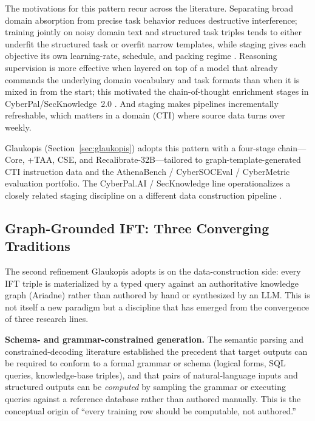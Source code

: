 \documentclass[conference]{IEEEtran}
\begin{document}
The motivations for this pattern recur across the literature. Separating broad domain absorption from precise task behavior reduces destructive interference; training jointly on noisy domain text and structured task triples tends to either underfit the structured task or overfit narrow templates, while staging gives each objective its own learning-rate, schedule, and packing regime \cite{gururangan2020dontstop,ouyang2022instructgpt}. Reasoning supervision is more effective when layered on top of a model that already commands the underlying domain vocabulary and task formats than when it is mixed in from the start; this motivated the chain-of-thought enrichment stages in CyberPal/SecKnowledge~2.0 \cite{wei2022cot,levi2025toward}. And staging makes pipelines incrementally refreshable, which matters in a domain (CTI) where source data turns over weekly.

Glaukopis (Section~\ref{sec:glaukopis}) adopts this pattern with a four-stage chain---Core, +TAA, CSE, and Recalibrate-32B---tailored to graph-template-generated CTI instruction data and the AthenaBench / CyberSOCEval / CyberMetric evaluation portfolio. The CyberPal.AI / SecKnowledge line operationalizes a closely related staging discipline on a different data construction pipeline \cite{levi2024cyberpal,levi2025toward}.

\subsection{Graph-Grounded IFT: Three Converging Traditions}
\label{sec:ift-structured}

The second refinement Glaukopis adopts is on the data-construction side: every IFT triple is materialized by a typed query against an authoritative knowledge graph (Ariadne) rather than authored by hand or synthesized by an LLM. This is not itself a new paradigm but a discipline that has emerged from the convergence of three research lines.

\textbf{Schema- and grammar-constrained generation.} The semantic parsing and constrained-decoding literature established the precedent that target outputs can be required to conform to a formal grammar or schema (logical forms, SQL queries, knowledge-base triples), and that pairs of natural-language inputs and structured outputs can be \emph{computed} by sampling the grammar or executing queries against a reference database rather than authored manually. This is the conceptual origin of ``every training row should be computable, not authored.''
\end{document}
